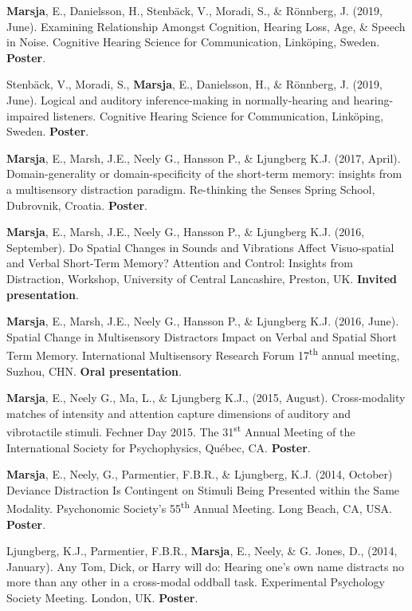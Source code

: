 \documentclass[]{article}
\begin{document}
\textbf{Marsja}, E., Danielsson, H., Stenbäck, V., Moradi, S., \&
Rönnberg, J. (2019, June). Examining Relationship Amongst Cognition,
Hearing Loss, Age, \& Speech in Noise. Cognitive Hearing Science for
Communication, Linköping, Sweden. \textbf{Poster}.

Stenbäck, V., Moradi, S., \textbf{Marsja}, E., Danielsson, H., \&
Rönnberg, J. (2019, June). Logical and auditory inference-making in
normally-hearing and hearing-impaired listeners. Cognitive Hearing
Science for Communication, Linköping, Sweden. \textbf{Poster}.

\textbf{Marsja}, E., Marsh, J.E., Neely G., Hansson P., \& Ljungberg
K.J. (2017, April). Domain-generality or domain-specificity of the
short-term memory: insights from a multisensory distraction paradigm.
Re-thinking the Senses Spring School, Dubrovnik, Croatia.
\textbf{Poster}.

\textbf{Marsja}, E., Marsh, J.E., Neely G., Hansson P., \& Ljungberg
K.J. (2016, September). Do Spatial Changes in Sounds and Vibrations
Affect Visuo-spatial and Verbal Short-Term Memory? Attention and
Control: Insights from Distraction, Workshop, University of Central
Lancashire, Preston, UK. \textbf{Invited presentation}.

\textbf{Marsja}, E., Marsh, J.E., Neely G., Hansson P., \& Ljungberg
K.J. (2016, June). Spatial Change in Multisensory Distractors Impact on
Verbal and Spatial Short Term Memory. International Multisensory
Research Forum 17\textsuperscript{th} annual meeting, Suzhou, CHN.
\textbf{Oral presentation}.

\textbf{Marsja}, E., Neely G., Ma, L., \& Ljungberg K.J., (2015,
August). Cross-modality matches of intensity and attention capture
dimensions of auditory and vibrotactile stimuli. Fechner Day 2015. The
31\textsuperscript{st} Annual Meeting of the International Society for
Psychophysics, Québec, CA. \textbf{Poster}.

\textbf{Marsja}, E., Neely, G., Parmentier, F.B.R., \& Ljungberg, K.J.
(2014, October) Deviance Distraction Is Contingent on Stimuli Being
Presented within the Same Modality. Psychonomic Society's
55\textsuperscript{th} Annual Meeting. Long Beach, CA, USA.
\textbf{Poster}.

Ljungberg, K.J., Parmentier, F.B.R., \textbf{Marsja}, E., Neely, \& G.
Jones, D., (2014, January). Any Tom, Dick, or Harry will do: Hearing
one's own name distracts no more than any other in a cross-modal oddball
task. Experimental Psychology Society Meeting. London, UK.
\textbf{Poster}.
\end{document}
